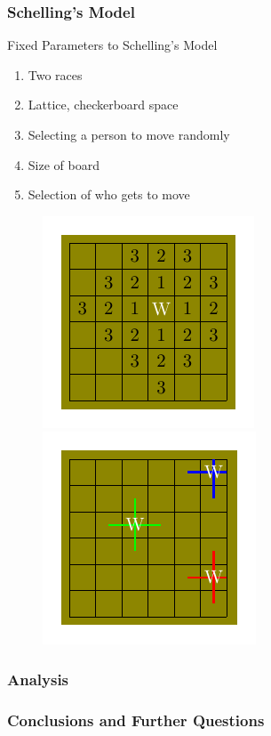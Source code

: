 \documentclass[11pt, handout]{beamer}
\begin{document}
\begin{frame}
    \frametitle{Schelling's Model}
    Fixed Parameters to Schelling's Model
    \begin{enumerate}
        \item Two races
        \item Lattice, checkerboard space
        \item Selecting a person to move randomly
        \item Size of board
        \item Selection of who gets to move
    \end{enumerate}
        \begin{figure}
            \center
            \includegraphics[scale=0.7]{cellular_automata_vision/cellular_automata_vision.pdf}
            \includegraphics[scale=0.7]{cellular_automata_trueedges/cellular_automata_trueedges.pdf}
        \end{figure}
\end{frame}

\begin{frame}
    \frametitle{Analysis}
\end{frame}

\begin{frame}
    \frametitle{Conclusions and Further Questions}
\end{frame}
\end{document}

